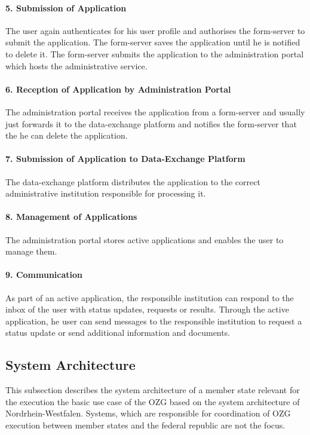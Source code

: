 \paragraph{5. Submission of Application}
The user again authenticates for his user profile and authorises the form-server to submit the application. The form-server saves the application until he is notified to delete it. The form-server submits the application to the administration portal which hosts the administrative service.

\paragraph{6. Reception of Application by Administration Portal}
The administration portal receives the application from a form-server and usually just forwards it to the data-exchange platform and notifies the form-server that the he can delete the application.

\paragraph{7. Submission of Application to Data-Exchange Platform}
The data-exchange platform distributes the application to the correct administrative institution responsible for processing it.

\paragraph{8. Management of Applications}
The administration portal stores active applications and enables the user to manage them.

\paragraph{9. Communication}
As part of an active application, the responsible institution can respond to the inbox of the user with status updates, requests or results.  Through the active application, he user can send messages to the responsible institution to request a status update or send additional information and documents.

\subsection{System Architecture}
This subsection describes the system architecture of a member state relevant for the execution the basic use case of the OZG based on the system architecture of Nordrhein-Westfalen. Systems, which are responsible for coordination of OZG execution between member states and the federal republic are not the focus.

